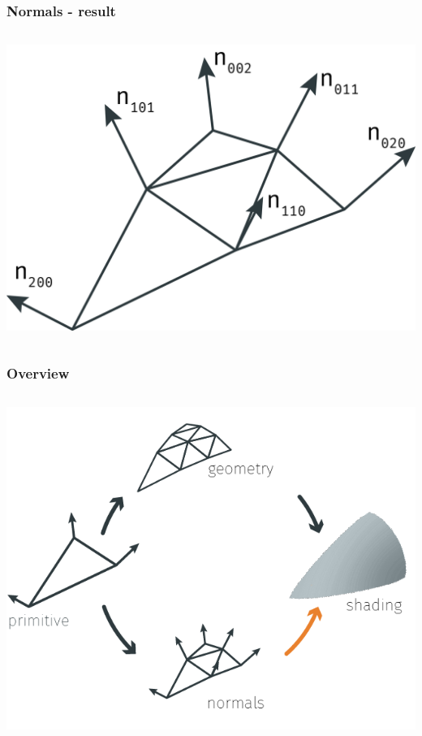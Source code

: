 	\begin{frame}
		\frametitle{Normals - result}
		\begin{columns}
			\begin{column}{0.6\textwidth}
				\begin{center}
					\includegraphics[width=\textwidth]{img/1_single/normals.png}
				\end{center}	
			\end{column}
		\end{columns}
	\end{frame}


	\begin{frame}\frametitle{Overview}
		\begin{columns}
			\begin{column}{0.9\textwidth}
				\begin{center}
					\includegraphics[width=\textwidth]{./img/1_single/recap_normalsToShading.png}
				\end{center}		
			\end{column}
		\end{columns}
	\end{frame}	


